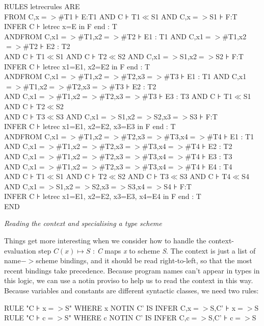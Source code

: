 \documentclass[11pt]{book}
\newcommand{\tab}{\hspace{5mm}}
\begin{document}
RULES letrecrules ARE\\
\tab FROM C,x$=>$\#T1 ⊦ E:T1 AND C ⊦ T1$\ll$S1 AND C,x$=>$S1 ⊦ F:T\\
\tab \tab INFER C ⊦ letrec x=E in F end : T\\
AND\tab FROM C,x1$=>$\#T1,x2$=>$\#T2 ⊦ E1 : T1 AND C,x1$=>$\#T1,x2$=>$\#T2 ⊦ E2 : T2 \\
\tab AND C ⊦ T1$\ll$S1 AND C ⊦ T2$\ll$S2 AND C,x1$=>$S1,x2$=>$S2 ⊦ F:T\tab \\
\tab \tab INFER C ⊦ letrec x1=E1, x2=E2 in F end : T\\
AND\tab FROM C,x1$=>$\#T1,x2$=>$\#T2,x3$=>$\#T3 ⊦ E1 : T1 AND C,x1$=>$\#T1,x2$=>$\#T2,x3$=>$\#T3 ⊦ E2 : T2\\
\tab AND C,x1$=>$\#T1,x2$=>$\#T2,x3$=>$\#T3 ⊦ E3 : T3 AND C ⊦ T1$\ll$S1 AND C ⊦ T2$\ll$S2\\
\tab AND C ⊦ T3$\ll$S3 AND C,x1$=>$S1,x2$=>$S2,x3$=>$S3 ⊦ F:T\\
\tab \tab INFER C ⊦ letrec x1=E1, x2=E2, x3=E3 in F end : T\\
AND\tab FROM C,x1$=>$\#T1,x2$=>$\#T2,x3$=>$\#T3,x4$=>$\#T4 ⊦ E1 : T1 \\
\tab AND C,x1$=>$\#T1,x2$=>$\#T2,x3$=>$\#T3,x4$=>$\#T4 ⊦ E2 : T2\\
\tab AND C,x1$=>$\#T1,x2$=>$\#T2,x3$=>$\#T3,x4$=>$\#T4 ⊦ E3 : T3 \\
\tab AND C,x1$=>$\#T1,x2$=>$\#T2,x3$=>$\#T3,x4$=>$\#T4 ⊦ E4 : T4\\
\tab AND C ⊦ T1$\ll$S1 AND C ⊦ T2$\ll$S2 AND C ⊦ T3$\ll$S3 AND C ⊦ T4$\ll$S4\\
\tab AND C,x1$=>$S1,x2$=>$S2,x3$=>$S3,x4$=>$S4 ⊦ F:T\\
\tab \tab INFER C ⊦ letrec x1=E1, x2=E2, x3=E3, x4=E4 in F end : T\\
END


\textit{Reading the context and specialising a type scheme}


Things get more interesting when we consider how to handle the context-evaluation step $C(x)\mapsto S$ : \textit{C} maps \textit{x} to scheme \textit{S}. The context is just a list of name\ensuremath{->}scheme bindings, and it should be read right-to-left, so that the most recent bindings take precedence. Because program names can't appear in types in this logic, we can use a notin proviso to help us to read the context in this way. Because variables and constants are different syntactic classes, we need two rules:

RULE "C ⊦ x$=>$S" WHERE x NOTIN C' IS INFER C,x$=>$S,C' ⊦ x$=>$S\\
RULE "C ⊦ c$=>$S" WHERE c NOTIN C' IS INFER C,c$=>$S,C' ⊦ c$=>$S
\end{document}
